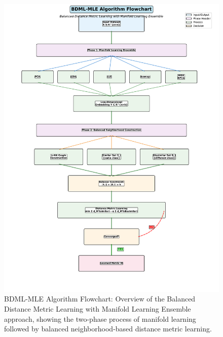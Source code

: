 \documentclass[review]{elsarticle}
\begin{document}
\begin{figure}[htbp]
\centering
\includegraphics[width=\textwidth]{bdml_mle_improved_flowchart.pdf}
\caption{BDML-MLE Algorithm Flowchart: Overview of the Balanced Distance Metric Learning with Manifold Learning Ensemble approach, showing the two-phase process of manifold learning followed by balanced neighborhood-based distance metric learning.}
\label{fig:bdml_flowchart}
\end{figure}
\end{document}
